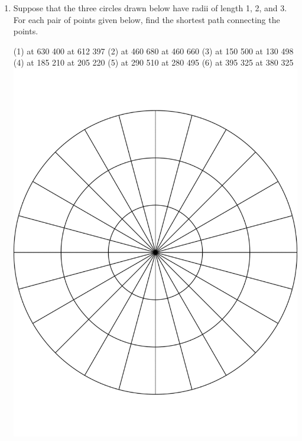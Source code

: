 \begin{enumerate}
\item Suppose that the three circles drawn below have radii of length 1, 2, and 3.  For each pair of points given below, find the shortest path connecting the points.
\vspace{-1in}
\begin{center}
		\large\hair 2pt
		\pinlabel (1) at 630 400
		\pinlabel {\huge$\bullet$} at 612 397
		\pinlabel (2) at 460 680
		\pinlabel {\huge$\bullet$} at 460 660
		\pinlabel (3) at 150 500
		\pinlabel {\huge$\bullet$} at 130 498
		\pinlabel (4) at 185 210
		\pinlabel {\huge$\bullet$} at 205 220
		\pinlabel (5) at 290 510
		\pinlabel {\huge$\bullet$} at 280 495
		\pinlabel (6) at 395 325
		\pinlabel {\huge$\bullet$} at 380 325
	\endlabellist
	\includegraphics[width=\textwidth]{radial_graph}
\end{center}

\vspace{-1in}
\begin{enumerate}
\end{enumerate}




\end{enumerate}

